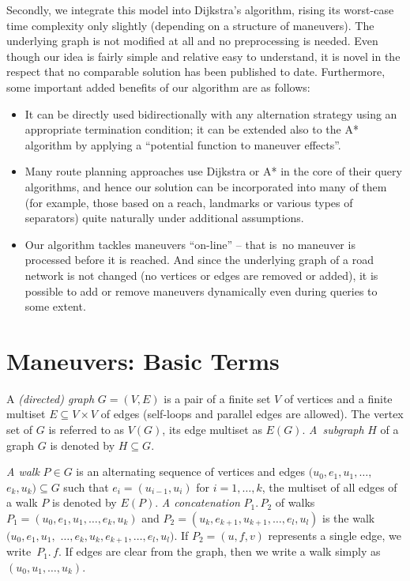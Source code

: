 \documentclass[envcountsect,envcountsame]{llncs}
\begin{document}
Secondly, we integrate this model into Dijkstra's algorithm, rising its 
worst-case time complexity only slightly (depending on a structure of 
maneuvers). The underlying graph is not modified at all and no preprocessing 
is needed. Even though our idea is fairly simple and relative easy to 
understand, it is novel in the respect that no comparable solution has been 
published to date. Furthermore, some important added benefits of our 
algorithm are as follows:

\begin{itemize}
\parskip 2pt
\item It can be directly used bidirectionally with any alternation strategy
  using an appropriate termination condition; it can be extended also to the 
  A* algorithm by applying a ``potential function to maneuver effects''.
  
\item Many route planning approaches use Dijkstra or A* in the core of their 
  query algorithms, and hence our solution can be incorporated into many of 
  them (for example, those based on a reach, landmarks or various types of 
  separators) quite naturally under additional assumptions.

\item Our algorithm tackles maneuvers ``on-line'' -- that is\ no maneuver 
  is processed before it is reached. And since the underlying graph of a 
  road network is not changed (no vertices or edges are removed or added),
  it is possible to add or remove maneuvers dynamically even during queries
  to some extent.
\end{itemize}

\section{Maneuvers: Basic Terms}
\label{sec:maneuvers}

A \emph{(directed) graph} $G=(V,E)$ is a pair of a finite set $V$ of vertices 
and a finite multiset $E \subseteq V \times V$ of edges (self-loops and 
parallel edges are allowed). The vertex set of $G$ is referred to as $V(G)$, 
its edge multiset as $E(G)$. \emph{A~subgraph} $H$ of a graph $G$ is denoted 
by $H \subseteq G$. 

\emph{A walk} $P \in G$ is an alternating sequence of vertices and 
edges $(u_0,e_1,u_1,\ldots,$ $e_k,u_k) \subseteq G$ such that $e_i = 
(u_{i-1},u_i)$ for $i = 1,\ldots,k$, the multiset of all edges of a walk $P$
is denoted by $E(P)$. \emph{A concatenation} $P_1 .\,P_2$ of 
walks $P_1=(u_0,e_1,u_1,\ldots,e_k,u_k)$ and $P_2=(u_k,e_{k+1},u_{k+1},\ldots,
e_l,u_l)$ is the walk $(u_0,e_1,u_1,$ $\ldots,e_k,u_k,e_{k+1},\ldots,e_l,u_l)$. 
If $P_2=(u,f,v)$ represents a single edge, we write~$P_1.\,f$. If edges are 
clear from the graph, then we write a walk simply as $(u_0,u_1,\dots,u_k)$.
\end{document}
